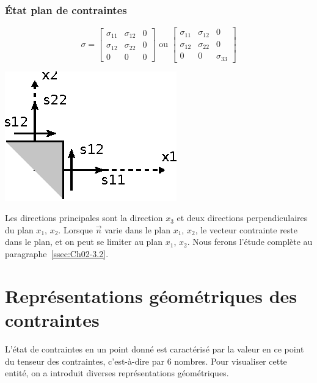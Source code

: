 \subsubsection{État plan de contraintes}
\begin{equation}
    \mathbb{\sigma} = 
    \begin{bmatrix}
        \sigma_{11} & \sigma_{12} & 0 \\
        \sigma_{12} & \sigma_{22} & 0 \\
        0 & 0 & 0
    \end{bmatrix}
    \text{ ou }
    \begin{bmatrix}
        \sigma_{11} & \sigma_{12} & 0 \\
        \sigma_{12} & \sigma_{22} & 0 \\
        0 & 0 & \sigma_{33}
    \end{bmatrix}
    \label{eq:Ch02-022}
\end{equation}
\begin{minipage}[l]{.3\textwidth}
    \begin{center}
        \includegraphics{../images/T1_Ch02-0010}
    \end{center}
\end{minipage}
\begin{minipage}[r]{.7\textwidth}
Les directions principales sont la direction $x_3$ et deux directions perpendiculaires du plan $x_1$, $x_2$.
Lorsque $\vec{n}$ varie dans le plan $x_1$, $x_2$, le vecteur contrainte reste dans le plan, et on peut se limiter au plan $x_1$, $x_2$.
Nous ferons l'étude complète au paragraphe~\ref{ssec:Ch02-3.2}.
\end{minipage}

\section{Représentations géométriques des contraintes} \label{sec:Ch02-2}
L'état de contraintes en un point donné est caractérisé par la valeur en ce point du tenseur des contraintes, c'est-à-dire par 6 nombres.
Pour visualiser cette entité, on a introduit diverses représentations géométriques.
